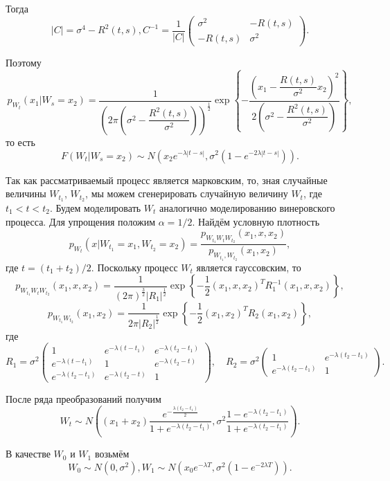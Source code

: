 Тогда
\[
|C|=\sigma^4-R^2(t,s), C^{-1}=\dfrac{1}{|C|}\begin{pmatrix}
\sigma^2&-R(t,s)\\
-R(t,s)&\sigma^2
\end{pmatrix}.
\]

Поэтому
\[
p_{W_t}(x_1|W_s=x_2)=\dfrac{1}{\left(2\pi\left(\sigma^2-\dfrac{R^2(t,s)}
 {\sigma^2}\right)\right)^{\frac{1}{2}}}\exp\left\lbrace-\dfrac{\left(x_1 - 
 \dfrac{R(t,s)}{\sigma^2}x_2\right)^2}{2\left(\sigma^2-\dfrac{R^2(t,s)}
 {\sigma^2}\right)}\right\rbrace,
\]
то есть
\[
F(W_t|W_s=x_2)\sim N\left(x_2e^{-\lambda|t-s|},\sigma^2\left(1-e^{-2 
 \lambda|t-s|}\right)\right).
\]

Так как рассматриваемый процесс является марковским, то, зная случайные 
 величины \( W_{t_1} \), \( W_{t_2} \), мы можем сгенерировать случайную 
 величину \( W_t \), где \( t_1<t<t_2 \). Будем моделировать \( W_t \) 
 аналогично моделированию винеровского процесса. Для упрощения положим 
 \( \alpha=1/2 \). Найдём условную плотность
\[
p_{W_{t}}(x|W_{t_1}=x_1,W_{t_2}=x_2)=\dfrac{p_{W_{t_1}W_tW_{t_2}}(x_1, x, 
 x_2)}{p_{W_{t_1},W_{t_2}}(x_1,x_2)},
\]
где \( t = (t_1 + t_2)/2 \). Поскольку процесс \( W_t \) является 
 гауссовским, то
\[
p_{W_{t_1}W_tW_{t_2}}(x_1,x,x_2) = \dfrac{1}{\left( 2 \pi \right)^{\frac{3}
 {2}} \left| R_1 \right|^{\frac{1}{2}}}\exp\left\lbrace-\dfrac{1}{2}(x_1, 
 x, x_2)^TR_1^{-1}(x_1,x,x_2)\right\rbrace,
\]
\[
p_{W_{t_1}W_{t_2}}(x_1,x_2)=\dfrac{1}{2\pi\left|R_2\right|^{\frac{1}{2}}} 
 \exp\left\lbrace-\dfrac{1}{2}(x_1,x_2)^TR_2(x_1,x_2)\right\rbrace,
\]
где
\[
R_1=\sigma^2\begin{pmatrix}
1&e^{-\lambda(t-t_1)}&e^{-\lambda(t_2-t_1)}\\
e^{-\lambda(t-t_1)}&1&e^{-\lambda(t_2-t)}\\
e^{-\lambda(t_2-t_1)}&e^{-\lambda(t_2-t)}&1
\end{pmatrix},\quad
R_2=\sigma^2\begin{pmatrix}
1&e^{-\lambda(t_2-t_1)}\\
e^{-\lambda(t_2-t_1)}&1
\end{pmatrix}.
\]

После ряда преобразований получим
\[
W_t\sim N\left((x_1+x_2)\dfrac{e^{-\frac{\lambda(t_2-t_1)}{2}}}{1 + 
 e^{-\lambda(t_2-t_1)}},\sigma^2\dfrac{1-e^{-\lambda(t_2-t_1)}}{1 + 
 e^{-\lambda(t_2-t_1)}}\right).
\]

В качестве \( W_0 \) и \( W_1 \) возьмём
\[
W_0\sim N(0,\sigma^2),W_1\sim N\left(x_0e^{-\lambda T}, \sigma^2\left(1 - 
 e^{-2\lambda T}\right)\right).
\]

